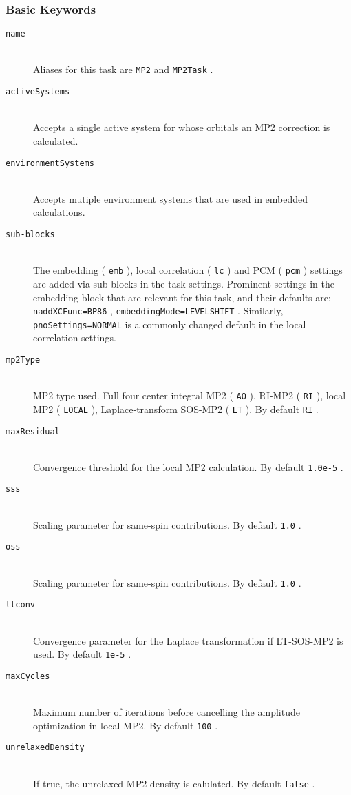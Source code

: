 \documentclass[bibliography=totocnumbered,a4paper,10pt,oneside]{scrbook}
\newcommand{\ttt}[1]{%
  \begingroup\setlength{\fboxsep}{1pt}%
  \colorbox{serenity-green!30}{\texttt{\hspace*{2pt}\vphantom{(g}#1\hspace*{2pt}}}%
  \endgroup
}
\begin{document}
\subsubsection{Basic Keywords}
\begin{description}
	\item [\texttt{name}]\hfill \\
	Aliases for this task are \ttt{MP2} and \ttt{MP2Task}.
	\item [\texttt{activeSystems}]\hfill \\
	Accepts a single active system for whose orbitals an MP2 correction is calculated.
	\item [\texttt{environmentSystems}]\hfill \\
	Accepts mutiple environment systems that are used in embedded calculations.
	\item [\texttt{sub-blocks}]\hfill \\
	The embedding (\ttt{emb}), local correlation (\ttt{lc}) and PCM (\ttt{pcm}) settings are added via sub-blocks in the task settings.
	Prominent settings in the embedding block that are relevant for this task, and their defaults are:
	\ttt{naddXCFunc=BP86}, \ttt{embeddingMode=LEVELSHIFT}.
	Similarly, \ttt{pnoSettings=NORMAL} is a commonly changed default in the local correlation settings.
	\item [\texttt{mp2Type}] \hfill \\ 
	MP2 type used. Full four center integral MP2 (\ttt{AO}), RI-MP2 (\ttt{RI}), local MP2 (\ttt{LOCAL}), Laplace-transform SOS-MP2 (\ttt{LT}). By default \ttt{RI}.
  \item[\texttt{maxResidual}]\hfill \\
	Convergence threshold for the local MP2 calculation. By default \ttt{1.0e-5}.
  \item[\texttt{sss}]\hfill \\
	Scaling parameter for same-spin contributions. By default \ttt{1.0}.
  \item[\texttt{oss}]\hfill \\
	Scaling parameter for same-spin contributions. By default \ttt{1.0}.
  \item[\texttt{ltconv}]\hfill \\
	Convergence parameter for the Laplace transformation if LT-SOS-MP2 is used. By default \ttt{1e-5}.
  \item[\texttt{maxCycles}]\hfill \\
  Maximum number of iterations before cancelling the amplitude optimization in local MP2. By default \ttt{100}.
  \item[\texttt{unrelaxedDensity}]\hfill \\
  If true, the unrelaxed MP2 density is calulated. By default \ttt{false}. 
\end{description}
\end{document}
